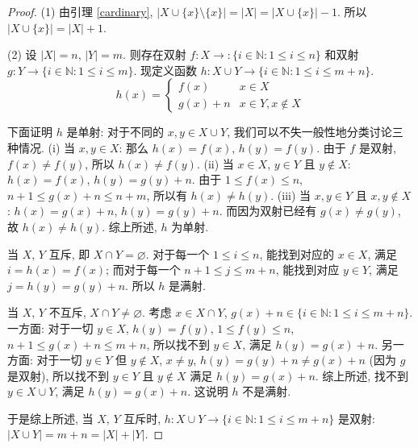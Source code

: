 \documentclass[UTF8]{ctexart}
\theoremstyle{mystyle}
\theoremstyle{myremark}
\theoremstyle{plain}
\newcommand{\N}{\mathbb N}
\newcommand{\set}[1]{\{#1\}}
\begin{document}
\begin{proof}
    (1) 由引理 \ref{cardinary}, $ |X \cup \set{x} \setminus \set{x}| = |X| = |X \cup \set{x}| - 1 $. 所以 $ |X \cup \set{x}| = |X| + 1 $.

    (2) 设 $ |X| = n $, $ |Y| = m $. 则存在双射 $ f \colon X \to \colon \set{i \in \N \colon 1 \leqslant i \leqslant n} $ 和双射 $ g \colon Y \to \set{i \in \N \colon 1 \leqslant i \leqslant m} $. 现定义函数 $ h \colon X \cup Y \to \set{i \in \N \colon 1 \leqslant i \leqslant m + n} $.
    \[ h(x) = \begin{cases}
        f(x) & x \in X \\
        g(x) + n & x \in Y, x \notin X
    \end{cases} \]

    下面证明 $ h $ 是单射: 对于不同的 $ x, y \in X \cup Y $, 我们可以不失一般性地分类讨论三种情况. (i) 当 $ x, y \in X $: 那么 $ h(x) = f(x) $, $ h(y) = f(y) $. 由于 $ f $ 是双射, $ f(x) \neq f(y) $, 所以 $ h(x) \neq f(y) $. (ii) 当 $ x \in X $, $ y \in Y $ 且 $ y \notin X $: $ h(x) = f(x) $, $ h(y) = g(y) + n $. 由于 $ 1 \leqslant f(x) \leqslant n $, $ n + 1 \leqslant g(x) + n \leqslant n + m $, 所以有 $ h(x) \neq h(y) $. (iii) 当 $ x, y \in Y $ 且 $ x, y \notin X $: $ h(x) = g(x) + n $, $ h(y) = g(y) + n $. 而因为双射已经有 $ g(x) \neq g(y) $, 故 $ h(x) \neq h(y) $. 综上所述, $ h $ 为单射.

    当 $ X $, $ Y $ 互斥, 即 $ X \cap Y = \varnothing $. 对于每一个 $ 1 \leqslant i \leqslant n $, 能找到对应的 $ x \in X $, 满足 $ i = h(x) = f(x) $; 而对于每一个 $ n + 1 \leqslant j \leqslant m + n $, 能找到对应 $ y \in Y $, 满足 $ j = h(y) = g(y) + n $. 所以 $ h $ 是满射.

    当 $ X $, $ Y $ 不互斥, $ X \cap Y \neq \varnothing $. 考虑 $ x \in X \cap Y $, $ g(x) + n \in \set{i \in \N \colon 1 \leqslant i \leqslant m + n} $. 一方面: 对于一切 $ y \in X $, $ h(y) = f(y) $, $ 1 \leqslant f(y) \leqslant n $, $ n + 1 \leqslant g(x) + n \leqslant m + n $, 所以找不到 $ y \in X $, 满足 $ h(y) = g(x) + n $. 另一方面: 对于一切 $ y \in Y $ 但 $ y \notin X $, $ x \neq y $, $ h(y) = g(y) + n \neq g(x) + n $ (因为 $ g $ 是双射), 所以找不到 $ y \in Y $ 且 $ y \notin X $ 满足 $ h(y) = g(x) + n $. 综上所述, 找不到 $ y \in X \cup Y $, 满足 $ h(y) = g(x) + n $. 这说明 $ h $ 不是满射.

    于是综上所述, 当 $ X $, $ Y $ 互斥时, $ h \colon X \cup Y \to \set{i \in \N \colon 1 \leqslant i \leqslant m + n} $ 是双射: $ |X \cup Y| = m + n = |X| + |Y| $. 
    

\end{proof}
\end{document}
